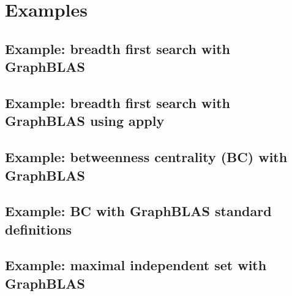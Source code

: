 \chapter{Examples}
\label{Chp:Examples}

\pagebreak
\nolinenumbers
\section{Example: breadth first search with GraphBLAS}
{\scriptsize

}

\pagebreak
\nolinenumbers
\section{Example: breadth first search with GraphBLAS using apply}
{\scriptsize

}

\pagebreak
\nolinenumbers
\section{Example: betweenness centrality (BC) with GraphBLAS}
{\scriptsize

}

\pagebreak
\nolinenumbers
\section{Example: BC with GraphBLAS standard definitions}
{\scriptsize

}

\pagebreak
\nolinenumbers
\section{Example: maximal independent set with GraphBLAS}
{\scriptsize

}

\pagebreak
